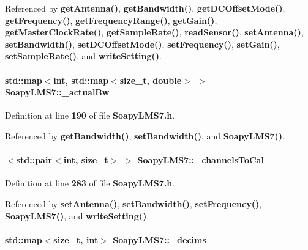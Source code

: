 Referenced by {\bf get\+Antenna()}, {\bf get\+Bandwidth()}, {\bf get\+D\+C\+Offset\+Mode()}, {\bf get\+Frequency()}, {\bf get\+Frequency\+Range()}, {\bf get\+Gain()}, {\bf get\+Master\+Clock\+Rate()}, {\bf get\+Sample\+Rate()}, {\bf read\+Sensor()}, {\bf set\+Antenna()}, {\bf set\+Bandwidth()}, {\bf set\+D\+C\+Offset\+Mode()}, {\bf set\+Frequency()}, {\bf set\+Gain()}, {\bf set\+Sample\+Rate()}, and {\bf write\+Setting()}.

\paragraph[{\+\_\+actual\+Bw}]{\setlength{\rightskip}{0pt plus 5cm}std\+::map$<${\bf int}, std\+::map$<$size\+\_\+t, double$>$ $>$ Soapy\+L\+M\+S7\+::\+\_\+actual\+Bw}\label{classSoapyLMS7_abd9e663b452b045f47c17f0484565a4f}


Definition at line {\bf 190} of file {\bf Soapy\+L\+M\+S7.\+h}.



Referenced by {\bf get\+Bandwidth()}, {\bf set\+Bandwidth()}, and {\bf Soapy\+L\+M\+S7()}.

\paragraph[{\+\_\+channels\+To\+Cal}]{$<$std\+::pair$<${\bf int}, size\+\_\+t$>$ $>$ Soapy\+L\+M\+S7\+::\+\_\+channels\+To\+Cal\hspace{0.3cm}{\ttfamily [private]}}\label{classSoapyLMS7_a8e430d3abe91ee369e919992e1a8c5df}


Definition at line {\bf 283} of file {\bf Soapy\+L\+M\+S7.\+h}.



Referenced by {\bf set\+Antenna()}, {\bf set\+Bandwidth()}, {\bf set\+Frequency()}, {\bf Soapy\+L\+M\+S7()}, and {\bf write\+Setting()}.

\paragraph[{\+\_\+decims}]{\setlength{\rightskip}{0pt plus 5cm}std\+::map$<$size\+\_\+t, {\bf int}$>$ Soapy\+L\+M\+S7\+::\+\_\+decims}\label{classSoapyLMS7_a61ab31ad116118325d7e2225c1c6a8c4}


